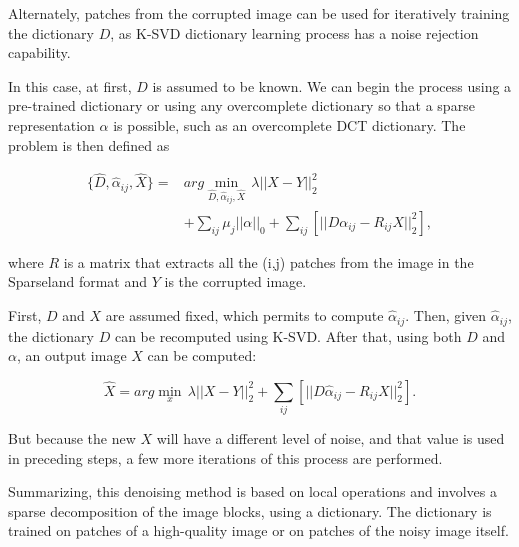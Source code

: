 Alternately, patches from the corrupted image can be used for iteratively training the dictionary $D$, as K-SVD dictionary learning process has a noise rejection capability.

In this case, at first, $D$ is assumed to be known. We can begin the process using a pre-trained dictionary or using any overcomplete dictionary so that a sparse representation $\alpha$ is possible, such as an overcomplete DCT dictionary. The problem is then defined as

\begin{equation}
	\begin{split}
    		\{\hat{D},\hat{\alpha}_{ij},\hat{X}\} = &arg \displaystyle\min_{\hat{D},\hat{\alpha}_{ij},\hat{X}}\,\lambda||X-Y||_{2}^{2}\\&+\displaystyle \sum_{ij}\mu_{j}||\alpha||_{0}+\displaystyle \sum_{ij}[||D\alpha_{ij}-R_{ij}X||_{2}^{2}],
	\end{split}
    \label{eq:ksvd_3}
\end{equation}

where $R$ is a matrix that extracts all the (i,j) patches from the image in the Sparseland format and $Y$ is the corrupted image.

First, $D$ and $X$ are assumed fixed, which permits to compute $\hat{\alpha}_{ij}$. Then, given $\hat{\alpha}_{ij}$, the dictionary $D$ can be recomputed using K-SVD. After that, using both $D$ and $\alpha$, an output image $X$ can be computed:

\begin{equation}
    \hat{X}=arg\displaystyle\min_{x}\,\lambda||X-Y||_{2}^{2}+\displaystyle \sum_{ij}[||D\hat{\alpha}_{ij}-R_{ij}X||_{2}^{2}].
    \label{eq:ksvd_4}
\end{equation}

But because the new $X$ will have a different level of noise, and that value is used in preceding steps, a few more iterations of this process are performed.

Summarizing, this denoising method is based on local operations and involves a sparse decomposition of the image blocks, using a dictionary. The dictionary is trained on patches of a high-quality image or on patches of the noisy image itself.